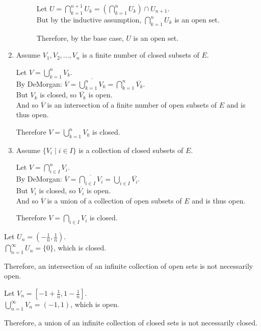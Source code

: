 \documentclass[letterpaper,12pt,fleqn]{article}
\newcommand{\comp}[1]{\overline{#1}}
\begin{document}
\begin{theproof}
\begin{enumerate}
\begin{description}
      Let $U=\bigcap_{k=1}^{n+1}U_k=
      \left(\bigcap_{k=1}^nU_k\right)\cap U_{n+1}$. \\
      But by the inductive assumption, $\bigcap_{k=1}^nU_k$ is an open set.

      Therefore, by the base case, $U$ is an open set.
    \end{description}

  \item Assume $V_1,V_2,\ldots,V_n$ is a finite number of closed subsets of
    $E$.

    Let $V=\bigcup_{k=1}^nV_k$. \\
    By DeMorgan: $\comp{V}=\comp{\bigcup_{k=1}^nV_k}=
    \bigcap_{k=1}^n\comp{V_k}$. \\
    But $V_k$ is closed, so $\comp{V_k}$ is open. \\
    And so $\comp{V}$ is an intersection of a finite number of open subsets of
    $E$ and is thus open.

    Therefore $V=\bigcup_{k=1}^nV_k$ is closed.

  \item Assume $\{V_i\mid i\in I\}$ is a collection of closed subsets of $E$.

    Let $V=\bigcap_{i\in I}^nV_i$. \\
    By DeMorgan: $\comp{V}=\comp{\bigcap_{i\in I}V_i}=
    \bigcup_{i\in I}\comp{V_i}$. \\
    But $V_i$ is closed, so $\comp{V_i}$ is open. \\
    And so $\comp{V}$ is a union of a collection of open subsets of $E$ and is
    thus open.

    Therefore $V=\bigcap_{i\in I}V_i$ is closed.
  \end{enumerate}
\end{theproof}

\begin{examples}
  Let $U_n=(-\frac{1}{n},\frac{1}{n})$. \\
  $\bigcap_{n=1}^{\infty}U_n=\{0\}$, which is closed.

  Therefore, an intersection of an infinite collection of open sets is not
  necessarily open.

  Let $V_n=[-1+\frac{1}{n},1-\frac{1}{n}]$. \\
  $\bigcup_{n=1}^{\infty}V_n=(-1,1)$, which is open.

  Therefore, a union of an infinite collection of closed sets is not
  necessarily closed.
\end{examples}
\end{document}
